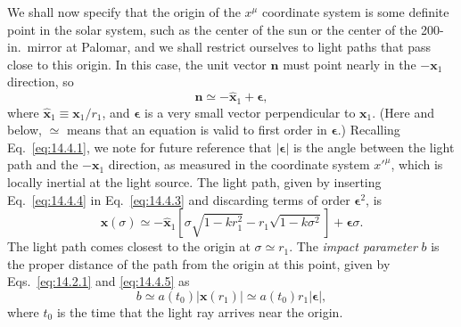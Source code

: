 We shall now specify that the origin of the \(x^\mu\) coordinate system is
some definite point in the solar system, such as the center of the sun or the
center of the 200-in.\ mirror at Palomar, and we shall restrict ourselves to
light paths that pass close to this origin. In this case, the unit vector
\(\mathbf{n}\) must point nearly in the \(-\mathbf{x}_1\) direction, so
\begin{equation}
  \mathbf{n}\simeq-\widehat{\mathbf{x}}_1+\boldsymbol{\epsilon},
  \tag{14.4.4}\label{eq:14.4.4}
\end{equation}
where \(\widehat{\mathbf{x}}_1\equiv\mathbf{x}_1/r_1\), and
\(\boldsymbol{\epsilon}\) is a very small vector perpendicular to
\(\mathbf{x}_1\). (Here and below, \(\simeq\) means that an equation is
valid to first order in \(\boldsymbol{\epsilon}\).) Recalling
Eq.~\eqref{eq:14.4.1}, we note for future reference that
\(\lvert\boldsymbol{\epsilon}\rvert\) is the angle between the light path
and the \(-\mathbf{x}_1\) direction, as measured in the coordinate system
\(x'^\mu\), which is locally inertial at the light source. The light path,
given by inserting Eq.~\eqref{eq:14.4.4} in Eq.~\eqref{eq:14.4.3} and
discarding terms of order \(\boldsymbol{\epsilon}^2\), is
\begin{equation}
  \mathbf{x}(\sigma)
  \simeq
  -\widehat{\mathbf{x}}_1
  \left[
    \sigma\sqrt{1-kr_1^2}
    -r_1\sqrt{1-k\sigma^2}
  \right]
  +\boldsymbol{\epsilon}\sigma.
  \tag{14.4.5}\label{eq:14.4.5}
\end{equation}
The light path comes closest to the origin at \(\sigma\simeq r_1\). The
\emph{impact parameter} \(b\) is the proper distance of the path from the
origin at this point, given by Eqs.~\eqref{eq:14.2.1} and
\eqref{eq:14.4.5} as
\begin{equation}
  b
  \simeq
  a(t_0)\lvert\mathbf{x}(r_1)\rvert
  \simeq
  a(t_0)r_1\lvert\boldsymbol{\epsilon}\rvert,
  \tag{14.4.6}\label{eq:14.4.6}
\end{equation}
where \(t_0\) is the time that the light ray arrives near the origin.


